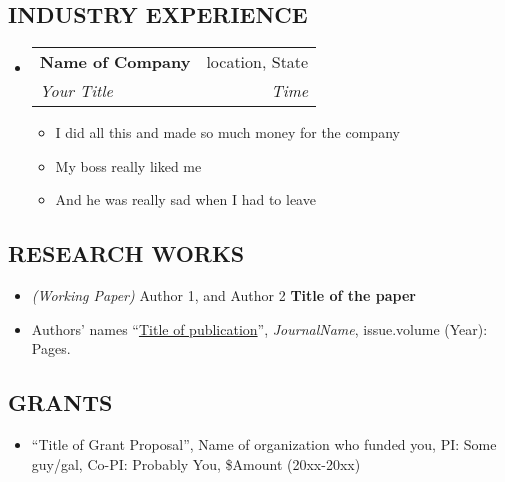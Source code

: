 \documentclass[letterpaper,11pt]{article}
\makeatletter
\newcommand{\ressubheading}[4]{
\begin{tabular*}{6.5in}{l@{\extracolsep{\fill}}r}
		\textbf{#1} & #2 \\
		\textit{#3} & \textit{#4} \\
\end{tabular*}\vspace{-6pt}}
\makeatother
\begin{document}
\subsection*{INDUSTRY EXPERIENCE}
\begin{itemize}
\item 
    \ressubheading{Name of Company}{location, State}{Your Title}{Time}
    \begin{itemize}
        \item I did all this and made so much money for the company 
        \item My boss really liked me
        \item And he was really sad when I had to leave  
    \end{itemize}
\end{itemize}
\vspace{0.1in}
\subsection*{RESEARCH WORKS}
\begin{itemize}
    \item \textit{(Working Paper)} Author 1, and Author 2  \textbf{Title of the paper}
    \item Authors' names ``\href{link to publication}{Title of publication}'', \textit{JournalName}, issue.volume (Year): Pages. 
    
\end{itemize}
\vspace{0.1in}
\subsection*{GRANTS}
\begin{itemize}
\item “Title of Grant Proposal”, Name of organization who funded you, PI: Some guy/gal, Co-PI: Probably You, \$Amount
(20xx-20xx)
\end{itemize}
\vspace{0.1in}
\end{document}
